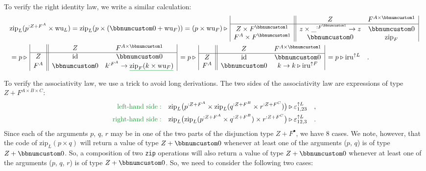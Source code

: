 To verify the right identity law, we write a similar calculation:
\begin{align*}
 & \text{zip}_{L}(p^{:Z+F^{A}}\times\text{wu}_{L})=\text{zip}_{L}(p\times(\bbnum 0+\text{wu}_{F}))=(p\times\text{wu}_{F})\triangleright\,\begin{array}{|c||cc|}
 & Z & F^{A\times\bbnum 1}\\
\hline Z\times F^{\bbnum 1} & z\times\_^{:F^{\bbnum 1}}\rightarrow z & \bbnum 0\\
F^{A}\times F^{\bbnum 1} & \bbnum 0 & \text{zip}_{F}
\end{array}\\
 & =p\triangleright\,\begin{array}{|c||cc|}
 & Z & F^{A\times\bbnum 1}\\
\hline Z & \text{id} & \bbnum 0\\
F^{A} & \bbnum 0 & k^{:F^{A}}\rightarrow\gunderline{\text{zip}_{F}(k\times\text{wu}_{F})}
\end{array}\,=p\triangleright\,\begin{array}{|c||cc|}
 & Z & F^{A\times\bbnum 1}\\
\hline Z & \text{id} & \bbnum 0\\
F^{A} & \bbnum 0 & k\rightarrow k\triangleright\text{iru}^{\uparrow F}
\end{array}\,=p\triangleright\text{iru}^{\uparrow L}\quad.
\end{align*}

To verify the associativity law, we use a trick to avoid long derivations.
The two sides of the associativity law are expressions of type $Z+F^{A\times B\times C}$:
\begin{align*}
{\color{greenunder}\text{left-hand side}:}\quad & \text{zip}_{L}\big(p^{:Z+F^{A}}\times\text{zip}_{L}(q^{:Z+F^{B}}\times r^{:Z+F^{C}})\big)\triangleright\varepsilon_{1,23}^{\uparrow L}\quad,\\
{\color{greenunder}\text{right-hand side}:}\quad & \text{zip}_{L}\big(\text{zip}_{L}(p^{:Z+F^{A}}\times q^{:Z+F^{B}})\times r^{:Z+F^{C}}\big)\triangleright\varepsilon_{12,3}^{\uparrow L}\quad.
\end{align*}
Since each of the arguments $p$, $q$, $r$ may be in one of the
two parts of the disjunction type $Z+F^{\bullet}$, we have 8 cases.
We note, however, that the code of $\text{zip}_{L}(p\times q)$ will
return a value of type $Z+\bbnum 0$ whenever at least one of the
arguments ($p$, $q$) is of type $Z+\bbnum 0$. So, a composition
of two \lstinline!zip! operations will also return a value of type
$Z+\bbnum 0$ whenever at least one of the arguments ($p$, $q$,
$r$) is of type $Z+\bbnum 0$. So, we need to consider the following
two cases: 

